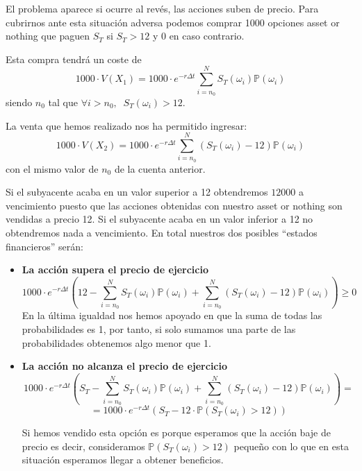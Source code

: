 \begin{problem}[7]
El problema aparece si ocurre al revés, las acciones suben de precio. Para cubrirnos ante esta situación adversa podemos comprar 1000 opciones asset or nothing que paguen $S_T$ si $S_T>12$ y 0 en caso contrario.

Esta compra tendrá un coste de
\[1000\cdot V(X_1) = 1000\cdot e^{-rΔt}\sum_{i=n_0}^NS_T(ω_i)\mathbb{P}(ω_i)\]
siendo $n_0$ tal que $\forall i>n_0, \;\; S_T(ω_i)>12$.

La venta que hemos realizado nos ha permitido ingresar:
\[1000\cdot V(X_2) = 1000 \cdot e^{-rΔt} \sum_{i=n_0}^N(S_T(ω_i)-12)\mathbb{P}(ω_i)\]
con el mismo valor de $n_0$ de la cuenta anterior.

Si el subyacente acaba en un valor superior a 12 obtendremos $12000$ a vencimiento puesto que las acciones obtenidas con nuestro asset or nothing son vendidas a precio 12. Si el subyacente acaba en un valor inferior a 12 no obtendremos nada a vencimiento. En total nuestros dos posibles ``estados financieros'' serán:
\begin{itemize}
\item \textbf{La acción supera el precio de ejercicio}
\[1000\cdot e^{-rΔt} \left(12-\sum_{i=n_0}^NS_T(ω_i)\mathbb{P}(ω_i)+\sum_{i=n_0}^N(S_T(ω_i)-12)\mathbb{P}(ω_i)\right) \geq 0\]
En la última igualdad nos hemos apoyado en que la suma de todas las probabilidades es 1, por tanto, si solo sumamos una parte de las probabilidades obtenemos algo menor que 1.
\item \textbf{La acción no alcanza el precio de ejercicio}
\[1000\cdot e^{-rΔt} \left(S_T-\sum_{i=n_0}^NS_T(ω_i)\mathbb{P}(ω_i)+\sum_{i=n_0}^N(S_T(ω_i)-12)\mathbb{P}(ω_i)\right) =\]
\[= 1000\cdot e^{-rΔt} \left(S_T -12 \cdot \mathbb{P}(S_T(ω_i)>12) \right)\]

Si hemos vendido esta opción es porque esperamos que la acción baje de precio es decir, consideramos $\mathbb{P}(S_T(ω_i)>12)$ pequeño con lo que en esta situación esperamos llegar a obtener beneficios.
\end{itemize}
\end{problem}

